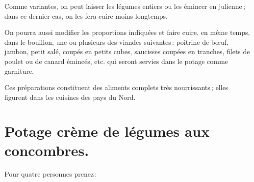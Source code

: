 \sk

Comme variantes, on peut laisser les légumes entiers ou les émincer en
julienne ; dans ce dernier cas, on les fera cuire moins longtemps.

On pourra aussi modifier les proportions indiquées et faire cuire, en même
temps, dans le bouillon, une ou plusieurs des viandes suivantes : poitrine de
bœuf, jambon, petit salé, coupés en petits cubes, saucisses coupées en
tranches, filets de poulet ou de canard émincés, etc. qui seront servies dans
le potage comme garniture.

\sk

Ces préparations constituent des aliments complets très nourrissants ; elles
figurent dans les cuisines des pays du Nord.

\section*{\centering Potage crème de légumes aux concombres.}

Pour quatre personnes prenez :

\medskip

